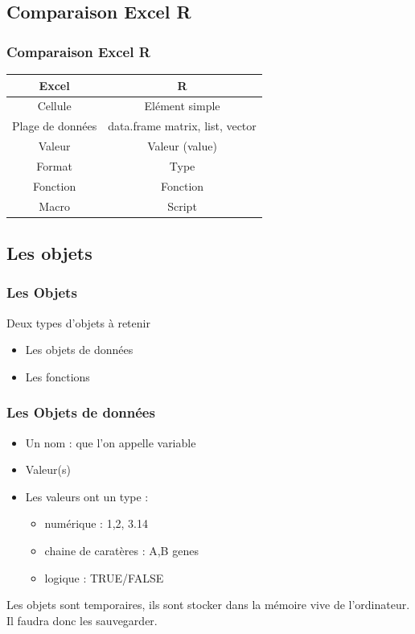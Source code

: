 \documentclass[table,svgnames,hyperref={pdfpagemode=FullScreen}]{beamer}
\begin{document}
\subsection{Comparaison Excel R}
\begin{frame}
	\frametitle{Comparaison Excel R}
	\begin{center}
{
	\begin{tabular}[h]{cc}
		\hline
		\textbf{Excel} &  \textbf{R} \pause\\
		\hline 
		
		Cellule & Elément simple \\
		Plage de données & data.frame matrix, list, vector \pause\\
		\hline
		Valeur & Valeur (value) \\
		Format & Type \pause\\
		\hline
		Fonction & Fonction \\
		Macro & Script \\
		\hline
	\end{tabular}}
	\end{center}
\end{frame}
\subsection{Les objets}
\begin{frame}
	\frametitle{Les Objets}
	\begin{exampleblock}{Deux types d'objets à retenir}
	\begin{itemize}
		\item Les objets de données
		\item Les fonctions
	\end{itemize}
	\end{exampleblock}
\end{frame}
\begin{frame}
	\frametitle{Les Objets de données}
	\begin{itemize}
		\item Un nom : que l'on appelle  variable
		\item Valeur(s)
		\item Les valeurs ont un type : 
			\begin{itemize}
				\item numérique : 1,2, 3.14
				\item chaine de caratères : A,B genes
				\item logique : TRUE/FALSE
			\end{itemize}
	\end{itemize}
	Les objets sont temporaires, ils sont stocker dans la mémoire vive de l'ordinateur. Il faudra donc les sauvegarder.
\end{frame}
\end{document}
